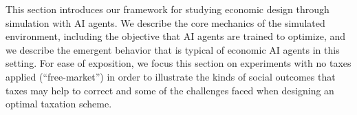 This section introduces our framework for studying economic design through simulation with AI agents.
We describe the core mechanics of the simulated environment, including the objective that AI agents are trained to optimize, and we describe the emergent behavior that is typical of economic AI agents in this setting.
For ease of exposition, we focus this section on experiments with no taxes applied (``free-market'') in order to illustrate the kinds of social outcomes that taxes may help to correct and some of the challenges faced when designing an optimal taxation scheme.